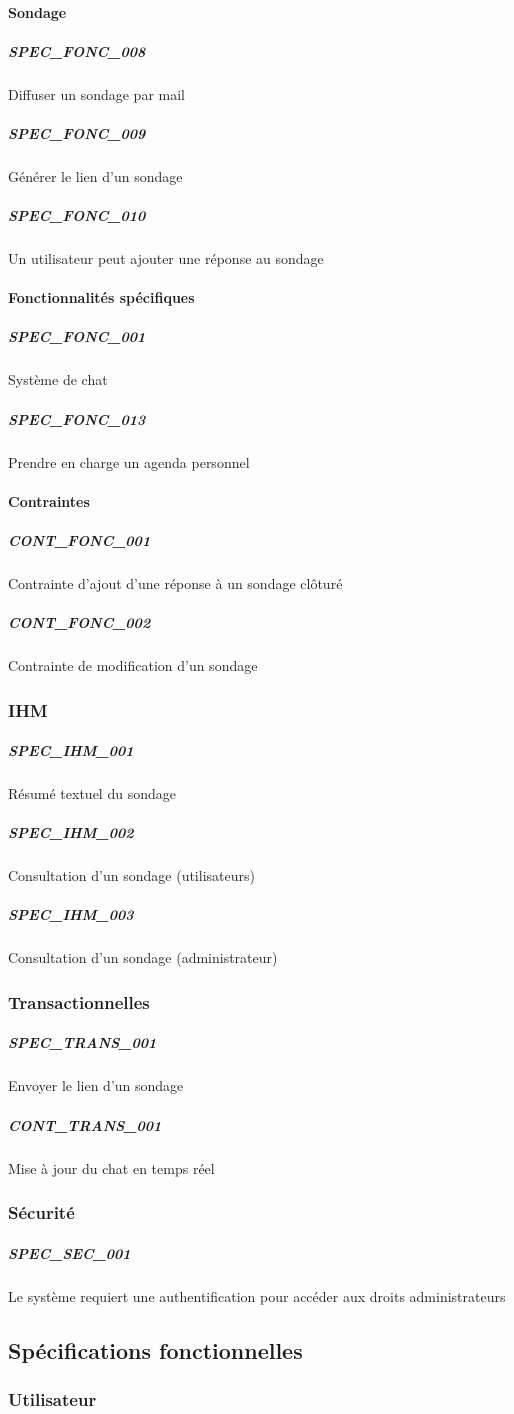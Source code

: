 \documentclass[titlepage]{report}
\begin{document}
\paragraph{Sondage}
\subparagraph{SPEC\_FONC\_008} Diffuser un sondage par mail
\subparagraph{SPEC\_FONC\_009} Générer le lien d’un sondage
\subparagraph{SPEC\_FONC\_010} Un utilisateur peut ajouter une réponse au sondage


\paragraph{Fonctionnalités spécifiques}
\subparagraph{SPEC\_FONC\_001} Système de chat
\subparagraph{SPEC\_FONC\_013} Prendre en charge un agenda personnel

\paragraph{Contraintes}
\subparagraph{CONT\_FONC\_001} Contrainte d’ajout d’une réponse à un sondage clôturé
\subparagraph{CONT\_FONC\_002} Contrainte de modification d’un sondage

\subsubsection{IHM}
\subparagraph{SPEC\_IHM\_001} Résumé textuel du sondage
\subparagraph{SPEC\_IHM\_002} Consultation d’un sondage (utilisateurs)
\subparagraph{SPEC\_IHM\_003} Consultation d’un sondage (administrateur)

\subsubsection{Transactionnelles}
\subparagraph{SPEC\_TRANS\_001} Envoyer le lien d’un sondage
\subparagraph{CONT\_TRANS\_001} Mise à jour du chat en temps réel

\subsubsection{Sécurité}
\subparagraph{SPEC\_SEC\_001} Le système requiert une authentification pour accéder aux droits administrateurs

\subsection{Spécifications fonctionnelles}

\subsubsection{Utilisateur}
\end{document}
